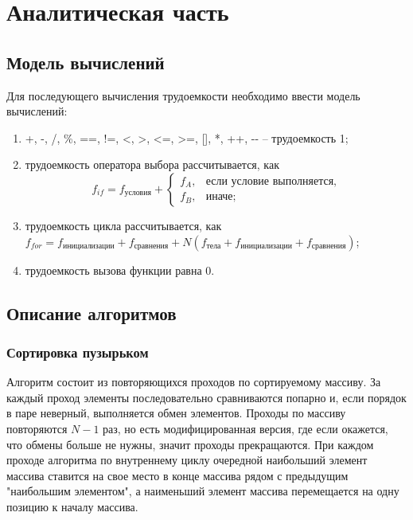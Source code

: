 \chapter{Аналитическая часть}

\section{Модель вычислений}

Для последующего вычисления трудоемкости необходимо ввести модель вычислений:
\begin{enumerate}
	\item +, -, /, \%, ==, !=, <, >, <=, >=, [], *, ++, {-}- -- трудоемкость 1;
	\item трудоемкость оператора выбора  рассчитывается, как 
	\begin{equation}
	f_{if} = f_{\text{условия}} +
	\begin{cases}
	f_A, & \text{если условие выполняется,}\\
	f_B, & \text{иначе;}
	\end{cases}
	\end{equation}
	\item трудоемкость цикла рассчитывается, как $f_{for} = f_{\text{инициализации}} + f_{\text{сравнения}} + N(f_{\text{тела}} + f_{\text{инициализации}} + f_{\text{сравнения}})$;
	\item трудоемкость вызова функции равна 0.
\end{enumerate}

\section{Описание алгоритмов}
\subsection{Сортировка пузырьком}

Алгоритм состоит из повторяющихся проходов по сортируемому массиву.
За каждый проход элементы последовательно сравниваются попарно и, если порядок в паре неверный, выполняется обмен элементов.
Проходы по массиву повторяются $N-1$ раз, но есть модифицированная версия, где если окажется, что обмены больше не нужны, значит проходы прекращаются.
При каждом проходе алгоритма по внутреннему циклу очередной наибольший элемент массива ставится на свое место в конце массива рядом с предыдущим "наибольшим элементом", а наименьший элемент массива перемещается на одну позицию к началу массива.

